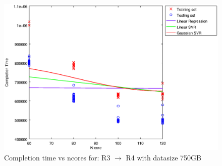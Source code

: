 
\begin {figure}[hbtp]
\centering
\includegraphics[width=\textwidth]{output/R3_R4_750_ALL_FEATURES/plot_R3_R4_750_bestmodels.eps}
\caption{Completion time vs ncores for: R3 $\rightarrow$ R4 with datasize 750GB}
\label{fig:coreonly_linear_R3_R4_750}
\end {figure}
